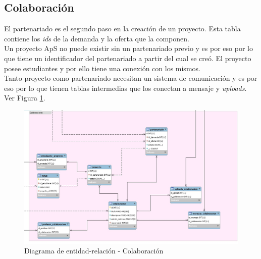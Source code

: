 \documentclass[11pt]{book}
\begin{document}
\subsection{Colaboración}
El partenariado es el segundo paso en la creación de un proyecto. Esta tabla contiene los \textit{ids} de la demanda y la oferta que la componen.\\
Un proyecto ApS no puede existir sin un partenariado previo y es por eso por lo que tiene un identificador del partenariado a partir del cual se creó. El proyecto posee estudiantes y por ello tiene una conexión con los mismos.\\
Tanto proyecto como partenariado necesitan un sistema de comunicación y es por eso por lo que tienen tablas intermedias que los conectan a mensaje y \textit{uploads}. Ver Figura \ref{fig:colaboracion}.
\begin{landscape}
	\begin{figure}[p]
		\includegraphics[scale=0.6]{colaboracion}
		\caption{Diagrama de entidad-relación - Colaboración}
		\label{fig:colaboracion}
	\end{figure}
\end{landscape}
\end{document}
